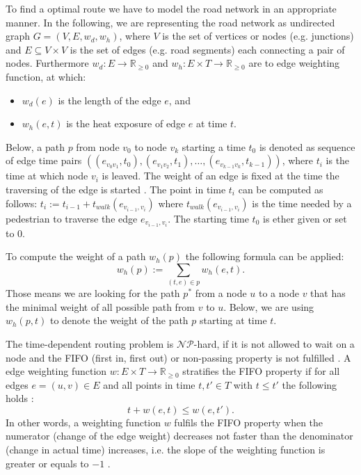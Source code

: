 To find a optimal route we have to model the road network in an appropriate manner. In the following, we are representing the road network as undirected graph $G=(V,E,w_d,w_h)$, where $V$ is the set of vertices or nodes (e.g. junctions) and $E\subseteq V\times V$ is the set of edges (e.g. road segments) each connecting a pair of nodes. Furthermore $w_d: E \to \mathbb{R}_{\geq 0}$ and $w_h: E \times T \to \mathbb{R}_{\geq 0}$ are to edge weighting function, at which:
\begin{itemize}
	\item $w_d(e)$ is the length of the edge $e$, and
	\item $w_h(e, t)$ is the heat exposure of edge $e$ at time $t$.
\end{itemize}   
Below, a path $p$ from node $v_0$ to node $v_k$ starting a time $t_0$ is denoted as sequence of edge time pairs $((e_{v_0v_1},t_0),(e_{v_1v_2},t_1),\dots, (e_{v_{k-1}v_k},t_{k-1}))$, where $t_i$ is the time at which node $v_i$ is leaved. The weight of an edge is fixed at the time the traversing of the edge is started \parencite[the so-called frozen link model,][]{Orda1990}. The point in time $t_i$ can be computed as follows: $t_i := t_{i-1} + t_{walk}(e_{v_{i-1},v_i})$ where $t_{walk}(e_{v_{i-1},v_i})$ is the time needed by a pedestrian to traverse the edge $e_{v_{i-1},v_i}$. The starting time $t_0$ is ether given or set to $0$. 

To compute the weight of a path $w_h(p)$ the following formula can be applied:
	\begin{equation}\label{eq:path-weight}
		w_h(p) := \sum_{(t,e) \in p} w_h(e, t).
	\end{equation}
Those means we are looking for the path $p^*$ from a node $u$ to a node $v$ that has the minimal weight of all possible path from $v$ to $u$. Below, we are using $w_h(p, t)$ to denote the weight of the path $p$ starting at time $t$. 

The time-dependent routing problem is $\mathcal{NP}$-hard, if it is not allowed to wait on a node and the FIFO (first in, first out) or non-passing property is not fulfilled \parencite{Orda1990}. A edge weighting function $w: E \times T \to \mathbb{R}_{\geq 0}$ stratifies the FIFO property if for all edges $e=(u,v)\in E$ and all points in time $t, t' \in T$ with $t \leq t'$ the following holds \parencite{Ahn1991}:
   \begin{equation}\label{eq:fifo-property}
  	 t + w(e,t) \leq w(e, t').
   \end{equation}
In other words, a weighting function $w$ fulfils the FIFO property when the numerator (change of the edge weight)
decreases not faster than the denominator (change in actual time) increases, i.e. the slope of the weighting function is greater or equals to $-1$ \parencite{Kaufman1993}.  

